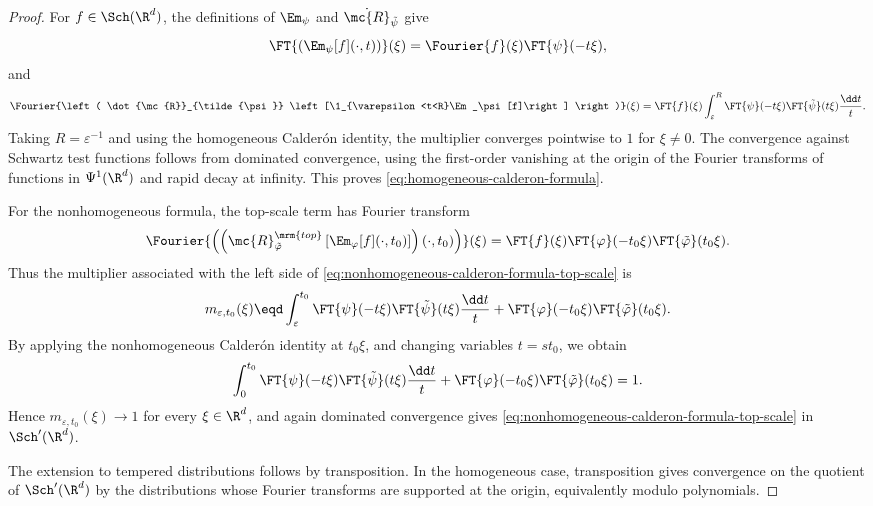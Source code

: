 \begin{proof} For \(f\in\Sch(\R^d)\), the definitions of \(\Em_\psi\) and \(\dot{\mc{R}}_{\tilde{\psi}}\) give
\[
\FT{\left(\Em_\psi[f](\cdot,t)\right)}(\xi)
=
\Fourier{f}(\xi)\FT{\psi}(-t\xi),
\]
and
\[
\Fourier{\left( \dot{\mc{R}}_{\tilde{\psi}} \left[\1_{\varepsilon<t<R}\Em_\psi[f]\right] \right)}(\xi)
=
\FT{f}(\xi) \int_{\varepsilon}^{R} \FT{\psi}(-t\xi)\FT{\tilde{\psi}}(t\xi) \frac{\dd t}{t}.
\]
Taking \(R=\varepsilon^{-1}\) and using the homogeneous Calder\'on identity, the multiplier converges pointwise to \(1\) for \(\xi\neq0\).
The convergence against Schwartz test functions follows from dominated convergence, using the first-order vanishing at the origin of the Fourier transforms of functions in \(\Psi^1(\R^d)\) and rapid decay at infinity.
This proves \eqref{eq:homogeneous-calderon-formula}.

For the nonhomogeneous formula, the top-scale term has Fourier transform
\[
\Fourier{\left(\left(\mc{R}^{\mrm{top}}_{\tilde{\varphi}} \left[\Em_\varphi[f](\cdot,t_0)\right] \right)(\cdot,t_0)\right)}(\xi)
=
\FT{f}(\xi) \FT{\varphi}(-t_0\xi)\FT{\tilde{\varphi}}(t_0\xi).
\]
Thus the multiplier associated with the left side of \eqref{eq:nonhomogeneous-calderon-formula-top-scale} is
\[
m_{\varepsilon,t_0}(\xi)
\eqd
\int_{\varepsilon}^{t_0} \FT{\psi}(-t\xi)\FT{\tilde{\psi}}(t\xi) \frac{\dd t}{t} + \FT{\varphi}(-t_0\xi)\FT{\tilde{\varphi}}(t_0\xi).
\]
By applying the nonhomogeneous Calder\'on identity at \(t_0\xi\), and changing variables \(t=s t_0\), we obtain
\[
\int_{0}^{t_0} \FT{\psi}(-t\xi)\FT{\tilde{\psi}}(t\xi) \frac{\dd t}{t} + \FT{\varphi}(-t_0\xi)\FT{\tilde{\varphi}}(t_0\xi) = 1.
\]
Hence \(m_{\varepsilon,t_0}(\xi)\to1\) for every \(\xi\in\R^d\), and again dominated convergence gives \eqref{eq:nonhomogeneous-calderon-formula-top-scale} in \(\Sch'(\R^d)\).

The extension to tempered distributions follows by transposition.
In the homogeneous case, transposition gives convergence on the quotient of \(\Sch'(\R^d)\) by the distributions whose Fourier transforms are supported at the origin, equivalently modulo polynomials.
\end{proof}

